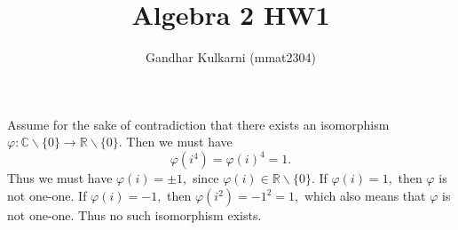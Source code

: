 \documentclass{article}
\title{Algebra 2 HW1} %
\author{Gandhar Kulkarni (mmat2304)} %
\date{} %
\begin{document}
\maketitle %


\section{} %
Assume for the sake of contradiction that there exists an isomorphism $\varphi: \mathbb{C}\backslash \{0\} \rightarrow \mathbb{R}\backslash \{0\}.$ Then we 
must have $$\varphi(i^4)=\varphi(i)^4=1.$$ Thus we must have $\varphi(i)=\pm 1,$ since $\varphi(i) \in \mathbb{R}\backslash \{0\}.$ If $\varphi(i)=1,$ then 
$\varphi$ is not one-one. If $\varphi(i)=-1,$ then $\varphi(i^2)=-1^2=1,$ which also means that $\varphi$ is not one-one. Thus no such isomorphism exists.

\section{} %

\section{} %
\section{} %
\section{} %
\section{} %
\end{document}
